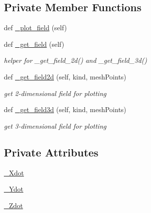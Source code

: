 \subsection*{Private Member Functions}
\begin{DoxyCompactItemize}
\item 
def \hyperlink{class_mu_mo_t_1_1_mu_mo_tfield_view_a50d59419298116f738a98c864afb9d89}{\+\_\+plot\+\_\+field} (self)
\item 
def \hyperlink{class_mu_mo_t_1_1_mu_mo_tfield_view_aefbf0e354438e17ab6d48e2d368f8540}{\+\_\+get\+\_\+field} (self)
\begin{DoxyCompactList}\small\item\em helper for \+\_\+get\+\_\+field\+\_\+2d() and \+\_\+get\+\_\+field\+\_\+3d() \end{DoxyCompactList}\item 
def \hyperlink{class_mu_mo_t_1_1_mu_mo_tfield_view_a854f5f5badcda687eff8a999e6700cb7}{\+\_\+get\+\_\+field2d} (self, kind, mesh\+Points)
\begin{DoxyCompactList}\small\item\em get 2-\/dimensional field for plotting \end{DoxyCompactList}\item 
def \hyperlink{class_mu_mo_t_1_1_mu_mo_tfield_view_a7e92a660924e058d070dd1799c27f126}{\+\_\+get\+\_\+field3d} (self, kind, mesh\+Points)
\begin{DoxyCompactList}\small\item\em get 3-\/dimensional field for plotting \end{DoxyCompactList}\end{DoxyCompactItemize}
\subsection*{Private Attributes}
\begin{DoxyCompactItemize}
\item 
\hyperlink{class_mu_mo_t_1_1_mu_mo_tfield_view_a0f5fba57766067c941f5a96b22545ed4}{\+\_\+\+Xdot}
\item 
\hyperlink{class_mu_mo_t_1_1_mu_mo_tfield_view_a31f5ad9d4a349b00e06772177200c217}{\+\_\+\+Ydot}
\item 
\hyperlink{class_mu_mo_t_1_1_mu_mo_tfield_view_a4008c2e6651cb1bf1c9c1af3e962a25d}{\+\_\+\+Zdot}
\end{DoxyCompactItemize}
